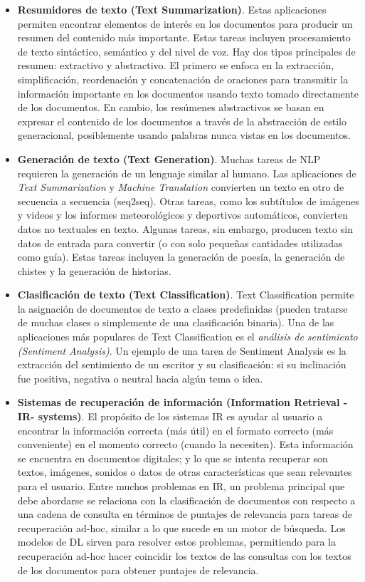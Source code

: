 \documentclass[12pt,a4paper]{article}
\begin{document}
\begin{sloppypar}
\begin{itemize}
\item \textbf{Resumidores de texto (Text Summarization)}. Estas aplicaciones permiten encontrar elementos de interés en los documentos para producir un resumen del contenido más importante. Estas tareas incluyen procesamiento de texto sintáctico, semántico y del nivel de voz. Hay dos tipos principales de resumen: extractivo y abstractivo. El primero se enfoca en la extracción, simplificación, reordenación y concatenación de oraciones para transmitir la información importante en los documentos usando texto tomado directamente de los documentos. En cambio, los resúmenes abstractivos se basan en expresar el contenido de los documentos a través de la abstracción de estilo generacional, posiblemente usando palabras nunca vistas en los documentos.

\item \textbf{Generación de texto (Text Generation)}. Muchas tareas de NLP requieren la generación de un lenguaje similar al humano. Las aplicaciones de \textit{Text Summarization} y \textit{Machine Translation} convierten un texto en otro de secuencia a secuencia (seq2seq). Otras tareas, como los subtítulos de imágenes y videos y los informes meteorológicos y deportivos automáticos, convierten datos no textuales en texto. Algunas tareas, sin embargo, producen texto sin datos de entrada para convertir (o con solo pequeñas cantidades utilizadas como guía). Estas tareas incluyen la generación de poesía, la generación de chistes y la generación de historias.

\item \textbf{Clasificación de texto (Text Classification)}. Text Classification permite la asignación de documentos de texto a clases predefinidas (pueden tratarse de muchas clases o simplemente de una clasificación binaria). Una de las aplicaciones más populares de Text Classification es el \textit{análisis de sentimiento (Sentiment Analysis)}. Un ejemplo de una tarea de Sentiment Analysis es la extracción del sentimiento de un escritor y su clasificación: si su inclinación fue positiva, negativa o neutral hacia algún tema o idea.

\item \textbf{Sistemas de recuperación de información (Information Retrieval -IR- systems)}. El propósito de los sistemas IR es ayudar al usuario a encontrar la información correcta (más útil) en el formato correcto (más conveniente) en el momento correcto (cuando la necesiten). Esta información se encuentra en documentos digitales; y lo que se intenta recuperar son textos, imágenes, sonidos o datos de otras características que sean relevantes para el usuario. Entre muchos problemas en IR, un problema principal que debe abordarse se relaciona con la clasificación de documentos con respecto a una cadena de consulta en términos de puntajes de relevancia para tareas de recuperación ad-hoc, similar a lo que sucede en un motor de búsqueda. Los modelos de DL sirven para resolver estos problemas, permitiendo para la recuperación ad-hoc hacer coincidir los textos de las consultas con los textos de los documentos para obtener puntajes de relevancia.


\end{itemize}
\end{sloppypar}
\end{document}

